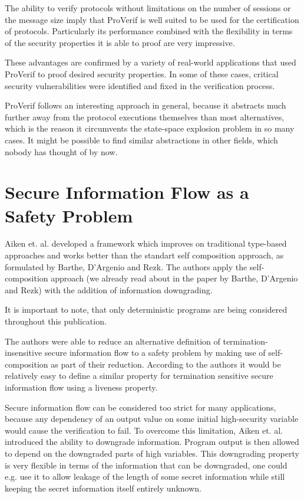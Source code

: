 \documentclass[a4paper,UKenglish]{lipics-v2018}
\begin{document}
The ability to verify protocols without limitations on the number of sessions or the message size imply that ProVerif is well suited to be used for the certification of protocols. Particularly its performance combined with the flexibility in terms of the security properties it is able to proof are very impressive.\cite{ProVerif}

These advantages are confirmed by a variety of real-world applications that used ProVerif to proof desired security properties. In some of  these cases, critical security vulnerabilities were identified and fixed in the verification process.

ProVerif follows an interesting approach in general, because it abstracts much further away from the protocol executions themselves than most alternatives, which is the reason it circumvents the state-space explosion problem in so many cases. It might be possible to find similar abstractions in other fields, which nobody has thought of by now.




\section{Secure Information Flow as a Safety Problem}

Aiken et. al. developed a framework which improves on traditional type-based approaches and works better than the standart self composition approach, as formulated by Barthe, D'Argenio and Rezk.\cite{information_flow_by_self_composition}
The authors apply the self-composition approach (we already read about in the paper by Barthe, D'Argenio and Rezk) with the addition of information downgrading.\cite{secure_information_flow_safety}

It is important to note, that only deterministic programs are being considered throughout this publication. 

The authors were able to reduce an alternative definition of termination-insensitive secure information flow to a safety problem by making use of self-composition as part of their reduction. According to the authors it would be relatively easy to define a similar property for termination sensitive secure information flow using a liveness property.\cite{secure_information_flow_safety}

Secure information flow can be considered too strict for many applications, because any dependency of an output value on some initial high-security variable would cause the verification to fail. To overcome this limitation, Aiken et. al. introduced the ability to downgrade information. Program output is then allowed to depend on the downgraded parts of high variables. This downgrading property is very flexible in terms of the information that can be downgraded, one could e.g. use it to allow leakage of the length of some secret information while still keeping the secret information itself entirely unknown.\cite{secure_information_flow_safety}
\end{document}

